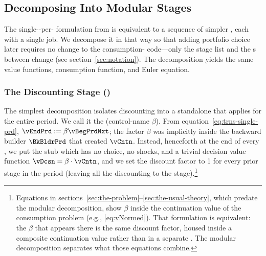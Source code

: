 \documentclass[titlepage, headings=optiontotocandhead]{econark}
\begin{document}
\hypertarget{stages-within-a-period}{}
\subsection{Decomposing Into Modular Stages}\label{subsec:stageswithin}

The single-{\stg}-per-{\interval} formulation from  is equivalent to a sequence of simpler {\stgs}, each with a single job.  We decompose it in that way so that adding portfolio choice later requires no change to the consumption-{\stg} code---only the stage list and the {\Cnct}s between {\stgs} change (see section~\ref{sec:notation}).  The decomposition yields the same value functions, consumption function, and Euler equation.

\hypertarget{disc-stage}{}
\subsubsection{The Discounting Stage ()}\label{subsubsec:disc-stage}

The simplest decomposition isolates discounting into a standalone {\stg} that applies for the entire period.  We call it the  {\stg} (control-name $\beta$).  From equation~\eqref{eq:trns-single-prd}, $\vEndPrd \leftassign \beta \vBegPrdNxt$; the factor $\beta$ was implicitly inside the backward builder $\BkBldrPrd$ that created $\vCntn$.  Instead, henceforth at the end of every {\interval},  we put the stub  {\stg} which has no choice, no shocks, and a trivial decision value function $\vDcsn = \beta \cdot \vCntn$, and we set the discount factor to 1 for every prior stage in the period (leaving all the discounting to the  stage).\footnote{Equations in sections~\ref{sec:the-problem}--\ref{sec:the-usual-theory}, which predate the modular decomposition, show $\beta$ inside the continuation value of the consumption problem (e.g., \eqref{eq:vNormed}).  That formulation is equivalent: the $\beta$ that appears there is the same discount factor, housed inside a composite continuation value rather than in a separate {\stg}.  The modular decomposition separates what those equations combine.}
\end{document}
